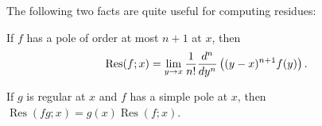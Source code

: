 \documentclass[12pt]{article}
\begin{document}
The following two facts are quite useful for computing residues:

If $f$ has a pole of order at most $n+1$ at $x$, then 
\[\operatorname{Res}(f;x) = \lim\limits_{y \to x} {1 \over n!} 
{d^n \over dy^n} \left( (y-x)^{n+1} f(y) \right).\]

If $g$ is regular at $x$ and $f$ has a simple pole at $x$, then $\operatorname{Res}(fg;x) = g(x) \operatorname{Res}(f;x)$.
\end{document}
